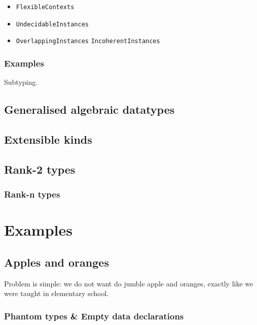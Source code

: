 \documentclass[11pt,oneside,draft]{fithesis2}
\begin{document}
\begin{itemize}
\item \texttt{FlexibleContexts}
\item \texttt{UndecidableInstances}
\item \texttt{OverlappingInstances} \texttt{IncoherentInstances}
\end{itemize}

\subsection{Examples}

Subtyping.

\section{Generalised algebraic datatypes}

\section{Extensible kinds}

\section{Rank-2 types}

\subsection{Rank-n types}


\chapter{Examples}

\section{Apples and oranges}

Problem is simple: we do not want do jumble apple and oranges,
exactly like we were taught in elementary school.

\subsection{Phantom types \& Empty data declarations}
\end{document}
